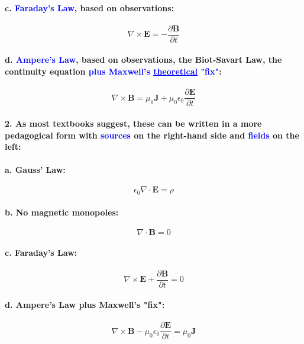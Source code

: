 \documentclass{article}
\begin{document}
\paragraph{\indent c. \textcolor{blue}{Faraday's Law}, based on observations:}
\begin{equation*}
    \nabla\times\boldsymbol{E}=-\frac{\partial \boldsymbol{B}}{\partial t}
\end{equation*} 
\paragraph{\indent d. \textcolor{blue}{Ampere's Law}, based on observations, the Biot-Savart Law, the continuity equation \textcolor{blue}{plus Maxwell's \underline{theoretical} "fix"}:}
\begin{equation*}
    \nabla\times\boldsymbol{B}=\mu_0\boldsymbol{J}+\mu_0\epsilon_0\frac{\partial\boldsymbol{E}}{\partial t}
\end{equation*}
\paragraph{2. As most textbooks suggest, these can be written in a more pedagogical form with \textcolor{blue}{sources} on the right-hand side and \textcolor{blue}{fields} on the left:}
\paragraph{\indent a. Gauss' Law:}
\begin{equation*}
    \epsilon_0\nabla\cdot\boldsymbol{E}=\rho
\end{equation*}
\paragraph{\indent b. No magnetic monopoles:}
\begin{equation*}
    \nabla\cdot\boldsymbol{B}=0
\end{equation*}
\paragraph{\indent c. Faraday's Law:}
\begin{equation*}
    \nabla\times\boldsymbol{E}+\frac{\partial\boldsymbol{B}}{\partial t}=0
\end{equation*}
\paragraph{\indent d. Ampere's Law plus Maxwell's "fix":}
\begin{equation*}
    \nabla\times\boldsymbol{B}-\mu_0\epsilon_0\frac{\partial\boldsymbol{E}}{\partial t}=\mu_0\boldsymbol{J}
\end{equation*}
\end{document}
